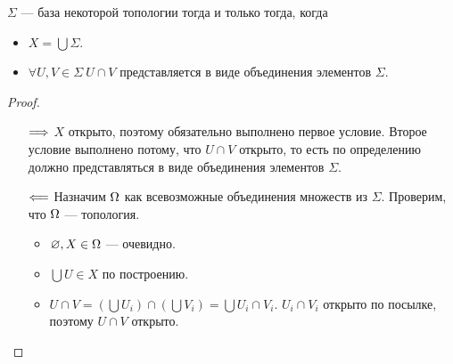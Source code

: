 \begin{theorem}
	$\Sigma$ --- база некоторой топологии тогда и только тогда, когда
	\begin{itemize}
		\item $X = \bigcup{\Sigma}$.
		\item $\forall U, V \in \Sigma~ U \cap V$ представляется в виде
			объединения элементов $\Sigma$.
	\end{itemize}
\end{theorem}
\begin{proof}
	\begin{itemize}
		\item[$\Longrightarrow$] $X$ открыто, поэтому обязательно выполнено первое
			условие. Второе условие выполнено потому,
			что $U \cap V$ открыто, то есть по определению должно представляться
			в виде объединения элементов $\Sigma$.
		\item[$\Longleftarrow$] Назначим $\Omega$ как всевозможные объединения множеств из $\Sigma$.
			Проверим, что $\Omega$ --- топология.
			\begin{itemize}
				\item $\varnothing, X \in \Omega$ --- очевидно.
				\item $\bigcup{U} \in X$ по построению.
				\item $U \cap V = \left(\bigcup{U_i}\right) \cap 
					\left(\bigcup{V_i}\right) = \bigcup{U_i \cap V_i}$.
					$U_i \cap V_i$ открыто по посылке, поэтому $U \cap V$
					открыто.
			\end{itemize}
	\end{itemize}
\end{proof}
